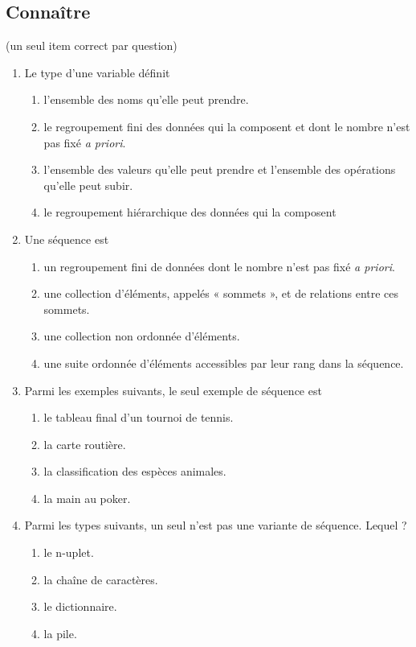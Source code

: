 \subsection{Connaître}
\begin{td}[QCM (4)]\label{td:qcmListes}(un seul item correct par question)
\em
\begin{enumerate}
\item Le type d'une variable définit 
	\begin{enumerate}
	\item l'ensemble des noms qu'elle peut prendre.
	\item le regroupement fini des données qui la composent et
		dont le nombre n'est pas fixé {\em a priori}.
	\item l'ensemble des valeurs qu'elle peut prendre et 
		l'ensemble des opérations qu'elle peut subir.
	\item le regroupement hiérarchique des données qui la composent 
	\end{enumerate}

\item Une séquence est 
	\begin{enumerate}
	\item un regroupement fini de données dont le nombre 
		n'est pas fixé {\em a priori}.
	\item une collection d'éléments, appelés « sommets », et de 
		relations entre ces sommets.
	\item une collection non ordonnée d'éléments.
	\item une suite ordonnée d'éléments
		accessibles par leur rang dans la séquence.
	\end{enumerate}

\item Parmi les exemples suivants, le seul exemple de séquence est
	\begin{enumerate}
	\item le tableau final d'un tournoi de tennis.
	\item la carte routière.
	\item la classification des espèces animales.
	\item la main au poker.
	\end{enumerate}

\item Parmi les types suivants, un seul n'est pas une variante de séquence. Lequel ?
	\begin{enumerate}
	\item le n-uplet.
	\item la chaîne de caractères.
	\item le dictionnaire.
	\item la pile.
	\end{enumerate}


\end{enumerate}
\end{td}
